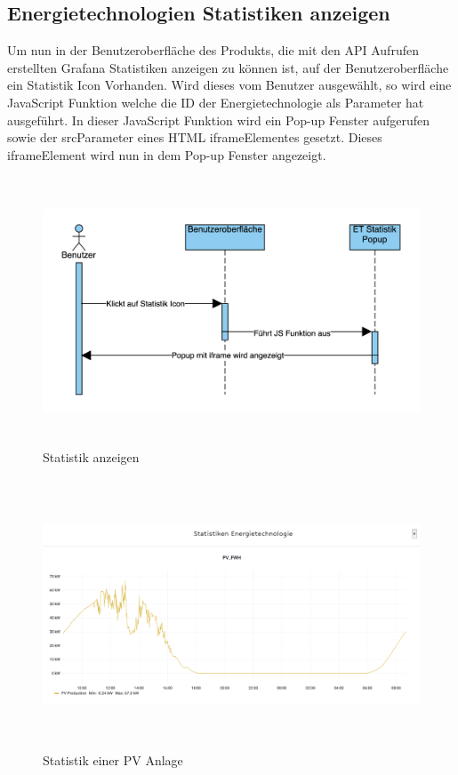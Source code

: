 \subsection{Energietechnologien Statistiken anzeigen}
Um nun in der Benutzeroberfläche des Produkts, die mit den API Aufrufen erstellten Grafana Statistiken anzeigen zu können ist, auf der Benutzeroberfläche ein Statistik Icon Vorhanden. Wird dieses vom Benutzer ausgewählt, so wird eine JavaScript Funktion welche die ID der Energietechnologie als Parameter hat ausgeführt. In dieser JavaScript Funktion wird ein Pop-up Fenster aufgerufen sowie der \glqq src\grqq \space Parameter eines HTML \glqq iframe\grqq \space Elementes gesetzt. Dieses \glqq iframe\grqq \space Element wird nun in dem Pop-up Fenster angezeigt.
\begin{figure}[h]
	\centering
	\includegraphics[height=8cm,width=14cm]{images/Statistikanzeigen}
	\caption{Statistik anzeigen}
	\label{fig:Statistikanzeigen }
\end{figure} 
\newpage


\begin{figure}[h]
	\centering
	\includegraphics[height=8cm,width=14cm]{images/bspstatistik}
	\caption{Statistik einer PV Anlage}
	\label{fig:Statistikbeispielpv }
\end{figure} 

